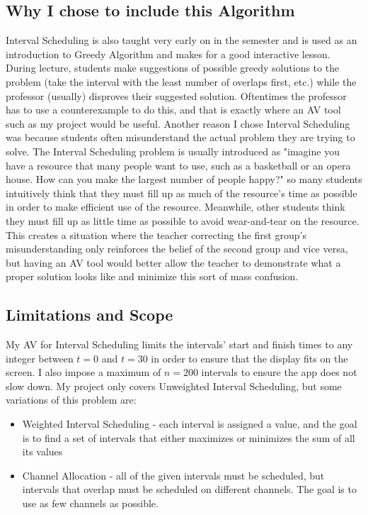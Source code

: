 \subsection{Why I chose to include this Algorithm}
\hspace{-0.26in}
Interval Scheduling is also taught very early on in the semester and
is used as an introduction to Greedy Algorithm and makes for 
a good interactive lesson. 
During lecture, students make suggestions of possible greedy solutions
to the problem
(take the interval with the least number of overlaps first, etc.)
while the professor (usually) disproves their suggested solution. 
Oftentimes the professor has to use a counterexample to do this,
and that is exactly where an AV tool such as my project would be useful.
\newline\newline
Another reason I chose Interval Scheduling was because students often 
misunderstand the actual problem they are trying to solve.
The Interval Scheduling problem is usually introduced as 
"imagine you have a resource that many people want to use, 
such as  a basketball or an opera house. 
How can you make the largest number of people happy?"
so many students intuitively think that they must fill up
as much of the resource's time as possible 
in order to make efficient use of the resource.
Meanwhile, other students think they must fill up as little time as possible
to avoid wear-and-tear on the resource. 
This creates a situation where the teacher correcting the first group's
misunderstanding only reinforces the belief of the second group and vice versa,
but having an AV tool would better allow the teacher to demonstrate 
what a proper solution looks like and minimize this sort of mass confusion.
\subsection{Limitations and Scope}
\hspace{-0.26in}
My AV for Interval Scheduling limits the intervals' start and finish times to 
any integer between $t=0$ and $t=30$
in order to ensure that the display fits on the screen. 
I also impose a maximum of $n = 200$ intervals
to ensure the app does not slow down. 
\newline\newline
My project only covers Unweighted Interval Scheduling, but
some variations of this problem are: 
\begin{itemize}
	\item Weighted Interval Scheduling - 
		each interval is assigned a value, 
		and the goal is to find a set of intervals that 
		either maximizes or minimizes the sum of all its values
	\item Channel Allocation - 
		all of the given intervals must be scheduled, 
		but intervals that overlap must be scheduled on different channels. 
		The goal is to use as few channels as possible. 
\end{itemize}
